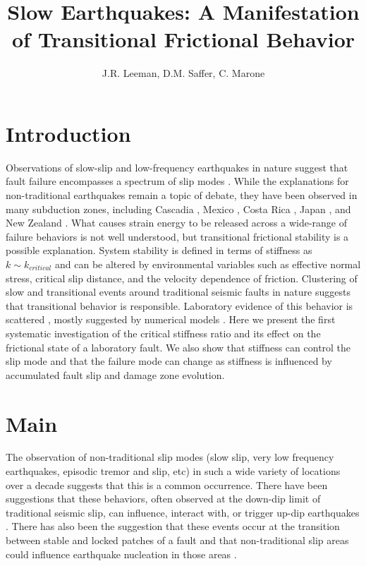 \documentclass[11pt]{article}
\title{Slow Earthquakes: A Manifestation of Transitional Frictional Behavior}
\author{J.R. Leeman, D.M. Saffer, C. Marone}
\date{} %
\begin{document}
\maketitle

\section{Introduction}
Observations of slow-slip and low-frequency earthquakes in nature suggest that
fault failure encompasses a spectrum of slip modes \cite{Peng:2010, Ide:2007,
Beroza:2011}.  While the explanations for non-traditional earthquakes remain a
topic of debate, they have been observed in many subduction zones, including
Cascadia \cite{Miller:2002, Rogers:2003}, Mexico \cite{Kostoglodov:2003}, Costa
Rica \cite{Jiang:2012}, Japan \cite{Ito:2006}, and New Zealand
\cite{Wallace:2010}. What causes strain energy to be released across a
wide-range of failure behaviors is not well understood, but transitional
frictional stability is a  possible explanation. System stability is defined in
terms of stiffness as $k \sim k_{critical}$ \cite{Gu:1984} and can be altered by
environmental variables such as effective normal stress, critical slip distance,
and the velocity dependence of friction. Clustering of slow and transitional
events around traditional seismic faults in nature suggests that transitional
behavior is responsible. Laboratory evidence of this behavior is scattered
\cite{Kaproth:2013, Baumberger:1994, Leeman:2015}, mostly suggested by numerical
models \cite{Gu:1984}. Here we present the first systematic investigation of the
critical stiffness ratio and its effect on the frictional state of a laboratory
fault. We also show that stiffness can control the slip mode and that the
failure mode can change as stiffness is influenced by accumulated fault slip and
damage zone evolution.


\section{Main}

The observation of non-traditional slip modes (slow slip, very low frequency
earthquakes, episodic tremor and slip, etc) in such a wide variety of locations
over a decade suggests that this is a common occurrence. There have been
suggestions that these behaviors, often observed at the down-dip limit of
traditional seismic slip, can influence, interact with, or trigger up-dip
earthquakes \cite{Dragert:2001ed,Ide:2007fi}. There has also been the suggestion
that these events occur at the transition between stable and locked patches
of a fault and that non-traditional slip areas could influence earthquake
nucleation in those areas \cite{Linde:1996hn}.
\end{document}
